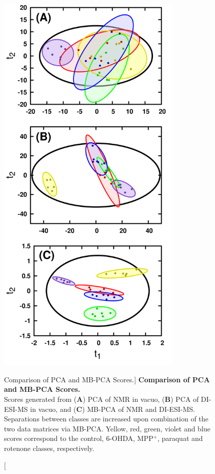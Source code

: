 \begin{figure}
\includegraphics[width=3.5in]{figs/apps/07-mbpca-t.png}
\caption
      [Comparison of PCA and MB-PCA Scores.]{
  {\bf Comparison of PCA and MB-PCA Scores.}
  \\
  Scores generated from ({\bf A}) PCA of \hnmr{} NMR in vacuo, ({\bf B}) PCA
  of DI-ESI-MS in vacuo, and ({\bf C}) MB-PCA of \hnmr{} NMR and DI-ESI-MS.
  Separations between classes are increased upon combination of the two
  data matrices via MB-PCA. Yellow, red, green, violet and blue scores
  correspond to the control, 6-OHDA, MPP$^+$, paraquat and rotenone classes,
  respectively.
}
\label{figure.4.7}
\end{figure}

